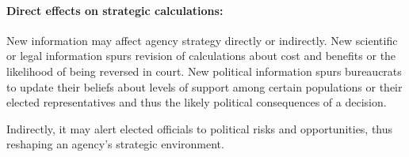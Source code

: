 

\paragraph{Direct effects on strategic calculations:} 
New information may affect agency strategy directly or indirectly. New scientific or legal information spurs revision of calculations about cost and benefits or the likelihood of being reversed in court. New political information spurs bureaucrats to update their beliefs about levels of support among certain populations or their elected representatives and thus the likely political consequences of a decision.

Indirectly, it may alert elected officials to political risks and opportunities, thus reshaping an agency's strategic environment.



% 



